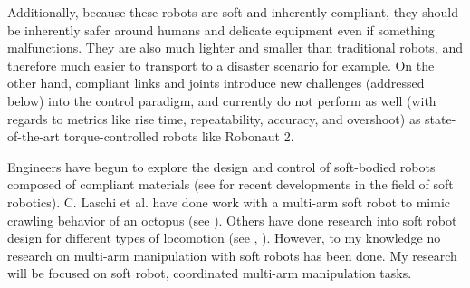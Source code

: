 \documentclass[12pt, letterpaper]{article}
\begin{document}
Additionally, because these robots are soft and inherently compliant, they should be inherently safer around humans and delicate equipment even if something malfunctions. They are also much lighter and smaller than traditional robots, and therefore much easier to transport to a disaster scenario for example. On the other hand, compliant links and joints introduce new challenges (addressed below) into the control paradigm, and currently do not perform as well (with regards to metrics like rise time, repeatability, accuracy, and overshoot) as state-of-the-art torque-controlled robots like Robonaut 2. 

Engineers have begun to explore the design and control of soft-bodied robots composed of compliant materials (see \cite{rus2015design} for recent developments in the field of soft robotics). C. Laschi et al. have done work with a multi-arm soft robot to mimic crawling behavior of an octopus (see \cite{li2012octopus, cianchetti2015bioinspired}). Others have done research into soft robot design for different types of locomotion (see \cite{shepherd2011multigait}, \cite{seok2013meshworm}). However, to my knowledge no research on multi-arm manipulation with soft robots has been done. My research will be focused on soft robot, coordinated multi-arm manipulation tasks. 
\end{document}
